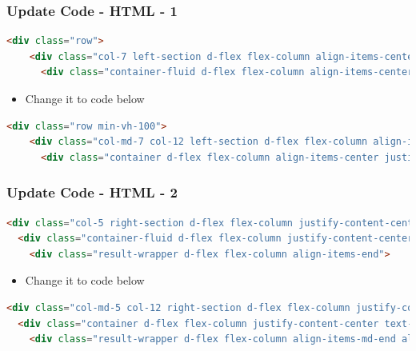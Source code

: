 \documentclass[aspectratio=169, table]{beamer}
\begin{document}
\begin{frame}[fragile]
    \frametitle{Update Code - HTML - 1}
    \vskip1cm
    \begin{lstlisting}[language=HTML]
<div class="row">
    <div class="col-7 left-section d-flex flex-column align-items-center justify-content-center">
      <div class="container-fluid d-flex flex-column align-items-center justify-content-center gap-4">
    \end{lstlisting}
 	
	\begin{itemize}
        \item Change it to code below
   	 \end{itemize}

\begin{lstlisting}[language=HTML]
  <div class="row min-vh-100">
    <div class="col-md-7 col-12 left-section d-flex flex-column align-items-center justify-content-center">
      <div class="container d-flex flex-column align-items-center justify-content-center gap-4">
    \end{lstlisting}
\end{frame}


\begin{frame}[fragile]
    \frametitle{Update Code - HTML - 2}
    \vskip1cm
    \begin{lstlisting}[language=HTML]
<div class="col-5 right-section d-flex flex-column justify-content-center text-light">
  <div class="container-fluid d-flex flex-column justify-content-center text-light">
    <div class="result-wrapper d-flex flex-column align-items-end">
    \end{lstlisting}
 	
	\begin{itemize}
        \item Change it to code below
   	 \end{itemize}

\begin{lstlisting}[language=HTML]
<div class="col-md-5 col-12 right-section d-flex flex-column justify-content-md-center justify-content-start text-light">
  <div class="container d-flex flex-column justify-content-center text-light">
    <div class="result-wrapper d-flex flex-column align-items-md-end align-items-center">
    \end{lstlisting}
\end{frame}
\end{document}
